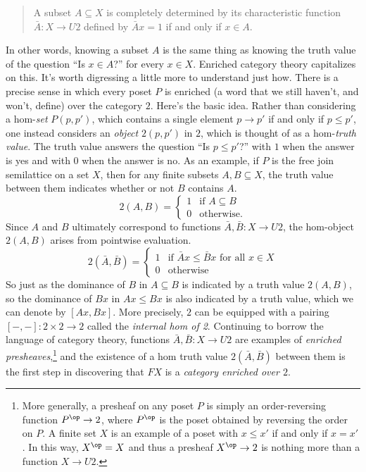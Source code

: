 \begin{quote}
A subset $A\subseteq X$ is completely determined by its characteristic function $\bar A\colon X\to U2$ defined by $\bar Ax=1$ if and only if $x\in A$.
\end{quote}
In other words, knowing a subset $A$ is the same thing as knowing the truth value of the question ``Is $x\in A$?'' for every $x\in X$. Enriched category theory capitalizes on this. It's worth digressing a little more to understand just how. There is a precise sense in which every poset $P$ is enriched (a word that we still haven't, and won't, define) over the category $2$. Here's the basic idea. Rather than considering a hom-\textit{set} $P(p,p')$, which contains a single element $p\to p'$ if and only if $p\leq p'$, one instead considers an \textit{object} $2(p,p')$ in $2$, which is thought of as a hom-\textit{truth value}. The truth value answers the question ``Is $p\leq p'$?'' with $1$ when the answer is yes and with $0$ when the answer is no. As an example, if $P$ is the free join semilattice on a set $X$, then for any finite subsets $A,B\subseteq X$, the truth value between them indicates whether or not $B$ contains $A$.
\begin{equation}
  2(A,B)=
  \begin{cases}
  1 &\text{if $A\subseteq B$}\\
  0 &\text{otherwise}.
  \end{cases}
\end{equation}
Since $A$ and $B$ ultimately correspond to functions $\bar A,\bar B\colon X\to U2$, the hom-object $2(A,B)$ arises from pointwise evaluation.
\begin{equation}
  2(\bar A,\bar B)=
  \begin{cases}
  1 &\text{if $\bar Ax \leq \bar Bx$ for all $x\in X$}\\
  0 &\text{otherwise}
  \end{cases}
\end{equation}
So just as the dominance of $B$ in $A\subseteq B$ is indicated by a truth value $2(A,B)$, so the dominance of $Bx$ in $Ax\leq Bx$ is also indicated by a truth value, which we can denote by $[Ax,Bx]$. More precisely, $2$ can be equipped with a pairing $[-,-]\colon 2\times 2\to 2$ called the \emph{internal hom of 2}. Continuing to borrow the language of category theory, functions $\bar A,\bar B\colon X\to U2$ are examples of \emph{enriched presheaves},\footnote{More generally, a presheaf on any poset $P$ is simply an order-reversing function $P^{\op}\to 2$, where $P^{\op}$ is the poset obtained by reversing the order on $P$. A finite set $X$ is an example of a poset with $x\leq x'$ if and only if $x=x'$. In this way, $X^{\op}=X$ and thus a presheaf $X^{\op}\to 2$ is nothing more than a function $X\to U2$.} and the existence of a hom truth value $2(\bar A,\bar B)$ between them is the first step in discovering that $FX$ is a \emph{category enriched over $2$}.


